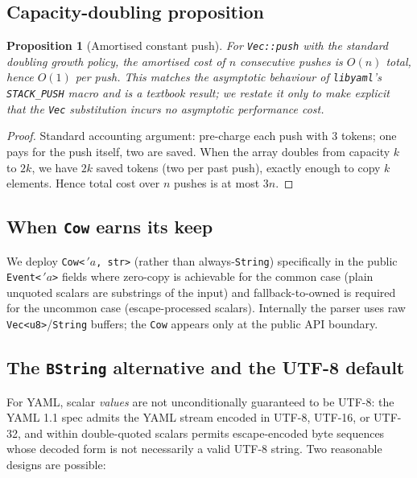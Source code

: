 \documentclass[12pt]{article}
\newtheorem{proposition}[theorem]{Proposition}
\theoremstyle{definition}
\theoremstyle{remark}
\newcommand{\lifetime}[1]{\ensuremath{\,'\!#1}}
\begin{document}
\subsection{Capacity-doubling proposition}

\begin{proposition}[Amortised constant push]
\label{thm:amortised}
For \texttt{Vec::push} with the standard doubling growth policy, the
amortised cost of $n$ consecutive pushes is $O(n)$ total, hence $O(1)$ per
push. This matches the asymptotic behaviour of \texttt{libyaml}'s
\texttt{STACK\_PUSH} macro and is a textbook result; we restate it only to
make explicit that the \texttt{Vec} substitution incurs no asymptotic
performance cost.
\end{proposition}

\begin{proof}
Standard accounting argument: pre-charge each push with $3$ tokens; one pays
for the push itself, two are saved. When the array doubles from capacity $k$
to $2k$, we have $2k$ saved tokens (two per past push), exactly enough to
copy $k$ elements. Hence total cost over $n$ pushes is at most $3n$.
\end{proof}

\subsection{When \texttt{Cow} earns its keep}

We deploy \texttt{Cow<\lifetime{a}, str>} (rather than always-\texttt{String})
specifically in the public \texttt{Event<\lifetime{a}>} fields where
zero-copy is achievable for the common case (plain unquoted scalars are
substrings of the input) and fallback-to-owned is required for the uncommon
case (escape-processed scalars). Internally the parser uses raw
\texttt{Vec<u8>}/\texttt{String} buffers; the \texttt{Cow} appears only at
the public API boundary.

\subsection{The \texttt{BString} alternative and the UTF-8 default}
\label{sec:utf8-default}

For YAML, scalar \emph{values} are not unconditionally guaranteed to be
UTF-8: the YAML 1.1 spec admits the YAML stream encoded in UTF-8, UTF-16,
or UTF-32, and within double-quoted scalars permits escape-encoded byte
sequences whose decoded form is not necessarily a valid UTF-8 string. Two
reasonable designs are possible:
\end{document}
